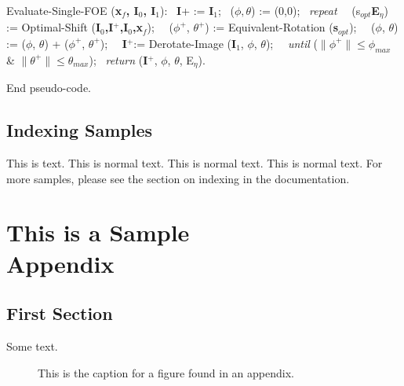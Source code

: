 \begin{algorithm}
{\bit Evaluate-Single-FOE} ({\bf x$_f$, I$_0$, I$_1$}):
\ {\bf I}+ := {\bf I}$_1$;
\ ($\phi,\theta$) := (0,0);
\ {\it repeat}
\ \ (s$_{opt}${\bf E}$_\eta$) := {\bit Optimal-Shift} ({\bf I$_0$,I$^+$,I$_0$,x$_f$});
\ \ ($\phi^+$, $\theta^+$) := {\bit Equivalent-Rotation} ({\bf s}$_{opt}$);
\ \ ($\phi$, $\theta$) := ($\phi$, $\theta$) + ($\phi^+$, $\theta^+$);
\ \ {\bf I}$^+$:= {\bit Derotate-Image} ({\bf I}$_1$, $\phi$, $\theta$);
\ \ {\it until} ($\|\phi^+\|\leq\phi_{max}$ \& $\|\theta^+\|\leq\theta_{max}$);
\ {\it return} ({\bf I}$^+$, $\phi$, $\theta$, E$_\eta$).

End pseudo-code.
\end{algorithm}


\section{Indexing Samples}


This is  text. 
This is normal text. 
This is normal text.
This is normal text.
For more samples, please see the section on indexing in the documentation.



\appendix

\chapter{This is a Sample\\ Appendix}
\section{First Section}
Some text.

\begin{figure}[h]
\caption{This is the caption for a figure found in
an appendix.}
\end{figure}


